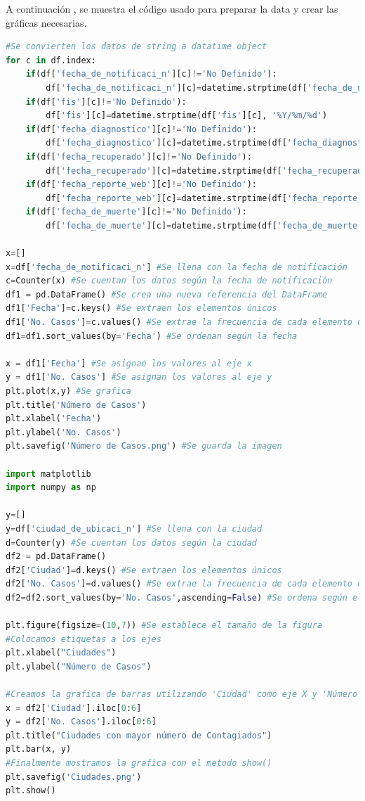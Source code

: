 \documentclass[conference,compsoc,onecolumn]{IEEEtran}
\begin{document}
A continuación , se muestra el código usado para preparar la data y crear las gráficas necesarias.
\begin{lstlisting}[language=python]
#Se convierten los datos de string a datatime object
for c in df.index:
    if(df['fecha_de_notificaci_n'][c]!='No Definido'):
        df['fecha_de_notificaci_n'][c]=datetime.strptime(df['fecha_de_notificaci_n'][c], '%Y/%m/%d')
    if(df['fis'][c]!='No Definido'):
        df['fis'][c]=datetime.strptime(df['fis'][c], '%Y/%m/%d')
    if(df['fecha_diagnostico'][c]!='No Definido'):
        df['fecha_diagnostico'][c]=datetime.strptime(df['fecha_diagnostico'][c], '%Y/%m/%d')
    if(df['fecha_recuperado'][c]!='No Definido'):
        df['fecha_recuperado'][c]=datetime.strptime(df['fecha_recuperado'][c], '%Y/%m/%d')
    if(df['fecha_reporte_web'][c]!='No Definido'):
        df['fecha_reporte_web'][c]=datetime.strptime(df['fecha_reporte_web'][c], '%Y/%m/%d')
    if(df['fecha_de_muerte'][c]!='No Definido'):
        df['fecha_de_muerte'][c]=datetime.strptime(df['fecha_de_muerte'][c], '%Y/%m/%d')
        
x=[] 
x=df['fecha_de_notificaci_n'] #Se llena con la fecha de notificación 
c=Counter(x) #Se cuentan los datos según la fecha de notificación
df1 = pd.DataFrame() #Se crea una nueva referencia del DataFrame
df1['Fecha']=c.keys() #Se extraen los elementos únicos
df1['No. Casos']=c.values() #Se extrae la frecuencia de cada elemento único
df1=df1.sort_values(by='Fecha') #Se ordenan según la fecha 

x = df1['Fecha'] #Se asignan los valores al eje x
y = df1['No. Casos'] #Se asignan los valores al eje y
plt.plot(x,y) #Se grafica
plt.title('Número de Casos')
plt.xlabel('Fecha')
plt.ylabel('No. Casos')
plt.savefig('Número de Casos.png') #Se guarda la imagen

import matplotlib
import numpy as np

y=[]
y=df['ciudad_de_ubicaci_n'] #Se llena con la ciudad
d=Counter(y) #Se cuentan los datos según la ciudad 
df2 = pd.DataFrame()
df2['Ciudad']=d.keys() #Se extraen los elementos únicos
df2['No. Casos']=d.values() #Se extrae la frecuencia de cada elemento único
df2=df2.sort_values(by='No. Casos',ascending=False) #Se ordena según el número de casos 

plt.figure(figsize=(10,7)) #Se establece el tamaño de la figura
#Colocamos etiquetas a los ejes
plt.xlabel("Ciudades")                       
plt.ylabel("Número de Casos") 

#Creamos la grafica de barras utilizando 'Ciudad' como eje X y 'Número de casos' como eje y.
x = df2['Ciudad'].iloc[0:6]
y = df2['No. Casos'].iloc[0:6]
plt.title("Ciudades con mayor número de Contagiados")
plt.bar(x, y)
#Finalmente mostramos la grafica con el metodo show()
plt.savefig('Ciudades.png')
plt.show()


\end{lstlisting}
\end{document}

